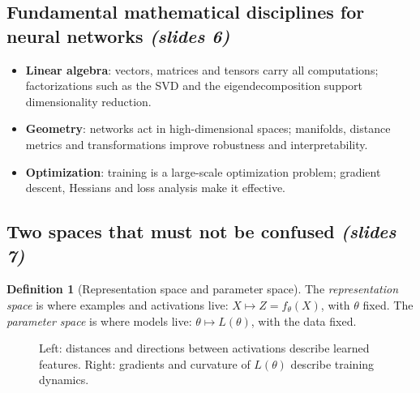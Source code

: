 \documentclass[11pt,a4paper]{article}
\newcommand{\slides}[1]{\texorpdfstring{\emph{(slides #1)}}{(slides #1)}}
\theoremstyle{definition}
\newtheorem{definition}{Definition}[section]
\theoremstyle{plain}
\begin{document}
\subsection{Fundamental mathematical disciplines for neural networks \slides{6}}

\begin{itemize}
  \item \textbf{Linear algebra}: vectors, matrices and tensors carry all computations; factorizations such as the SVD and the eigendecomposition support dimensionality reduction.
  \item \textbf{Geometry}: networks act in high-dimensional spaces; manifolds, distance metrics and transformations improve robustness and interpretability.
  \item \textbf{Optimization}: training is a large-scale optimization problem; gradient descent, Hessians and loss analysis make it effective.
\end{itemize}

\subsection{Two spaces that must not be confused \slides{7}}

\begin{definition}[Representation space and parameter space]
The \emph{representation space} is where examples and activations live: $X\mapsto Z=f_\theta(X)$, with $\theta$ fixed. The \emph{parameter space} is where models live: $\theta\mapsto L(\theta)$, with the data fixed.
\end{definition}

\begin{figure}[ht]
\centering
{}
\caption{Left: distances and directions between activations describe learned features. Right: gradients and curvature of $L(\theta)$ describe training dynamics.}
\end{figure}
\end{document}
